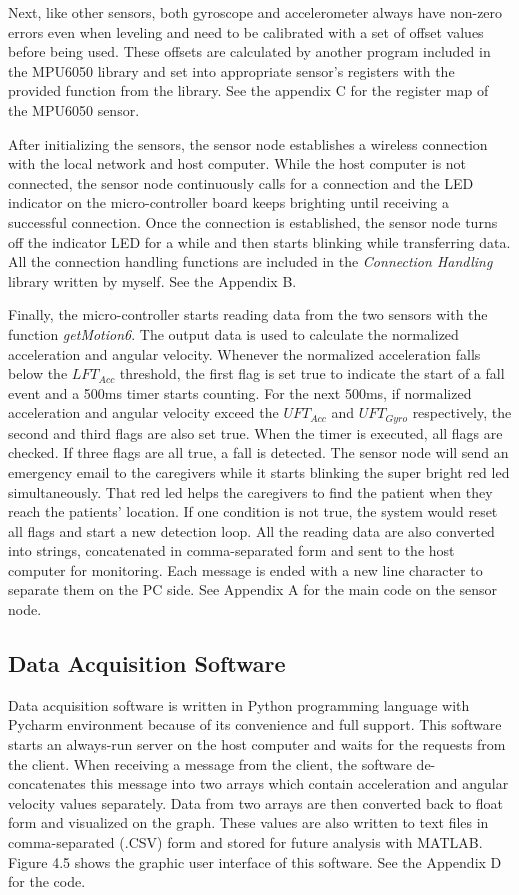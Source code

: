 \documentclass[letterpaper,12pt,titlepage,oneside,final]{book}
\begin{document}
Next, like other sensors, both gyroscope and accelerometer always have non-zero errors even when leveling and need to be calibrated with a set of offset values before being used. These offsets are calculated by another program included in the MPU6050 library and set into appropriate sensor's registers with the provided function from the library. See the appendix C for the register map of the MPU6050 sensor. \par
After initializing the sensors, the sensor node establishes a wireless connection with the local network and host computer. While the host computer is not connected, the sensor node continuously calls for a connection and the LED indicator on the micro-controller board keeps brighting until receiving a successful connection. Once the connection is established, the sensor node turns off the indicator LED for a while and then starts blinking while transferring data. All the connection handling functions are included in the \textit{Connection Handling} library written by myself. See the Appendix B.\par 

Finally, the micro-controller starts reading data from the two sensors with the function \textit{getMotion6}. The output data is used to calculate the normalized acceleration and angular velocity. Whenever the normalized acceleration falls below the $LFT_{Acc}$ threshold, the first flag is set true to indicate the start of a fall event and a 500ms timer starts counting. For the next 500ms, if normalized acceleration and angular velocity exceed the $UFT_{Acc}$ and $UFT_{Gyro}$ respectively, the second and third flags are also set true. When the timer is executed, all flags are checked. If three flags are all true, a fall is detected. The sensor node will send an emergency email to the caregivers while it starts blinking the super bright red led simultaneously. That red led helps the caregivers to find the patient when they reach the patients' location. If one condition is not true, the system would reset all flags and start a new detection loop. All the reading data are also converted into strings, concatenated in comma-separated form and sent to the host computer for monitoring. Each message is ended with a new line character to separate them on the PC side. See Appendix A for the main code on the sensor node. 
\subsection{Data Acquisition Software}
Data acquisition software is written in Python programming language with Pycharm environment because of its convenience and full support. This software starts an always-run server on the host computer and waits for the requests from the client. When receiving a message from the client, the software de-concatenates this message into two arrays which contain acceleration and angular velocity values separately.  Data from two arrays are then converted back to float form and visualized on the graph. These values are also written to text files in comma-separated (.CSV) form and stored for future analysis with MATLAB. Figure 4.5 shows the graphic user interface of this software. See the Appendix D for the code. 
 
\end{document}
